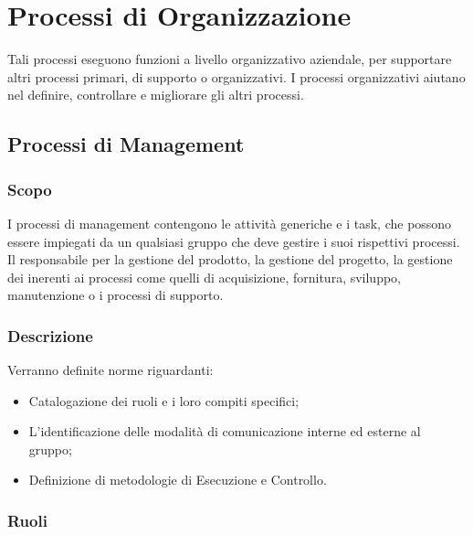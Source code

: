 \documentclass[12pt,a4paper]{article}
\begin{document}
\section{Processi di Organizzazione} %

Tali processi eseguono funzioni a livello organizzativo aziendale, per supportare altri processi primari, di supporto o organizzativi.
I processi organizzativi aiutano nel definire, controllare e migliorare gli altri processi.

\subsection{Processi di Management}

\subsubsection{Scopo} %

I processi di management contengono le attività generiche e i task, che possono essere impiegati da un qualsiasi gruppo che deve gestire i suoi rispettivi processi. Il \PM{} responsabile per la gestione del prodotto, la gestione del progetto, la gestione dei \textit{} inerenti ai processi come quelli di acquisizione, fornitura, sviluppo, manutenzione o i processi di supporto.

\subsubsection{Descrizione} %

Verranno definite norme riguardanti:
\begin{itemize}
  \item Catalogazione dei ruoli e i loro compiti specifici;
  \item L'identificazione delle modalità di comunicazione interne ed esterne al gruppo;
  \item Definizione di metodologie di Esecuzione e Controllo.
\end{itemize}

\subsubsection{Ruoli}\label{Ruoli}
\end{document}
